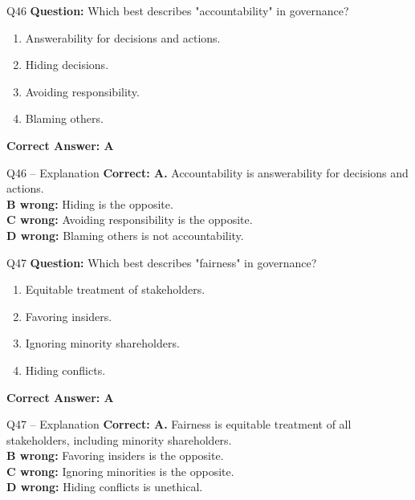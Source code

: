 \documentclass[aspectratio=169,10pt]{beamer}
\begin{document}
	\begin{frame}[t]{Q46}
		\small
		\textbf{Question:} Which best describes "accountability" in governance?
		\begin{enumerate}[label=\Alph*.,itemsep=1pt,topsep=2pt]
			\item Answerability for decisions and actions.
			\item Hiding decisions.
			\item Avoiding responsibility.
			\item Blaming others.
		\end{enumerate}
		\vspace{4pt}
		\textbf{Correct Answer: A}
	\end{frame}
	
	\begin{frame}[t]{Q46 -- Explanation}
		\small
		\textbf{Correct: A.} Accountability is answerability for decisions and actions. \\[4pt]
		\textbf{B wrong:} Hiding is the opposite. \\[2pt]
		\textbf{C wrong:} Avoiding responsibility is the opposite. \\[2pt]
		\textbf{D wrong:} Blaming others is not accountability.
	\end{frame}
	
	\begin{frame}[t]{Q47}
		\small
		\textbf{Question:} Which best describes "fairness" in governance?
		\begin{enumerate}[label=\Alph*.,itemsep=1pt,topsep=2pt]
			\item Equitable treatment of stakeholders.
			\item Favoring insiders.
			\item Ignoring minority shareholders.
			\item Hiding conflicts.
		\end{enumerate}
		\vspace{4pt}
		\textbf{Correct Answer: A}
	\end{frame}
	
	\begin{frame}[t]{Q47 -- Explanation}
		\small
		\textbf{Correct: A.} Fairness is equitable treatment of all stakeholders, including minority shareholders. \\[4pt]
		\textbf{B wrong:} Favoring insiders is the opposite. \\[2pt]
		\textbf{C wrong:} Ignoring minorities is the opposite. \\[2pt]
		\textbf{D wrong:} Hiding conflicts is unethical.
	\end{frame}
	
\end{document}
